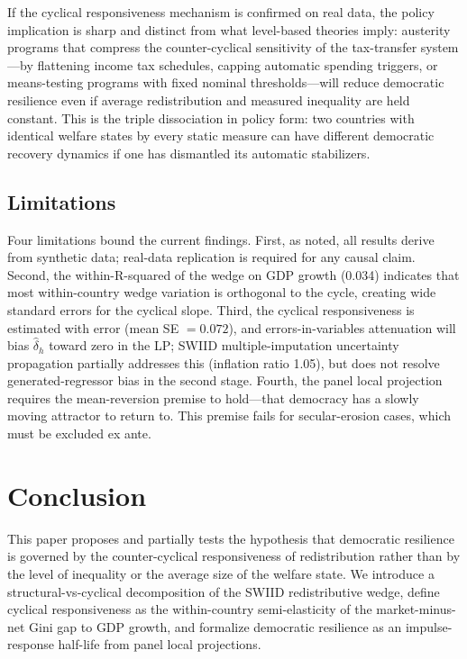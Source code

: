 \documentclass[11pt,letterpaper]{article}
\begin{document}
If the cyclical responsiveness mechanism is confirmed on real data, the policy implication is sharp and distinct from what level-based theories imply: austerity programs that compress the counter-cyclical sensitivity of the tax-transfer system---by flattening income tax schedules, capping automatic spending triggers, or means-testing programs with fixed nominal thresholds---will reduce democratic resilience even if average redistribution and measured inequality are held constant. This is the triple dissociation in policy form: two countries with identical welfare states by every static measure can have different democratic recovery dynamics if one has dismantled its automatic stabilizers.

\subsection{Limitations}

Four limitations bound the current findings. First, as noted, all results derive from synthetic data; real-data replication is required for any causal claim. Second, the within-R-squared of the wedge on GDP growth (0.034) indicates that most within-country wedge variation is orthogonal to the cycle, creating wide standard errors for the cyclical slope. Third, the cyclical responsiveness is estimated with error (mean SE $= 0.072$), and errors-in-variables attenuation will bias $\hat{\delta}_h$ toward zero in the LP; SWIID multiple-imputation uncertainty propagation partially addresses this (inflation ratio 1.05), but does not resolve generated-regressor bias in the second stage. Fourth, the panel local projection requires the mean-reversion premise to hold---that democracy has a slowly moving attractor to return to. This premise fails for secular-erosion cases, which must be excluded ex ante.

\section{Conclusion}

This paper proposes and partially tests the hypothesis that democratic resilience is governed by the counter-cyclical responsiveness of redistribution rather than by the level of inequality or the average size of the welfare state. We introduce a structural-vs-cyclical decomposition of the SWIID redistributive wedge, define cyclical responsiveness as the within-country semi-elasticity of the market-minus-net Gini gap to GDP growth, and formalize democratic resilience as an impulse-response half-life from panel local projections.
\end{document}
